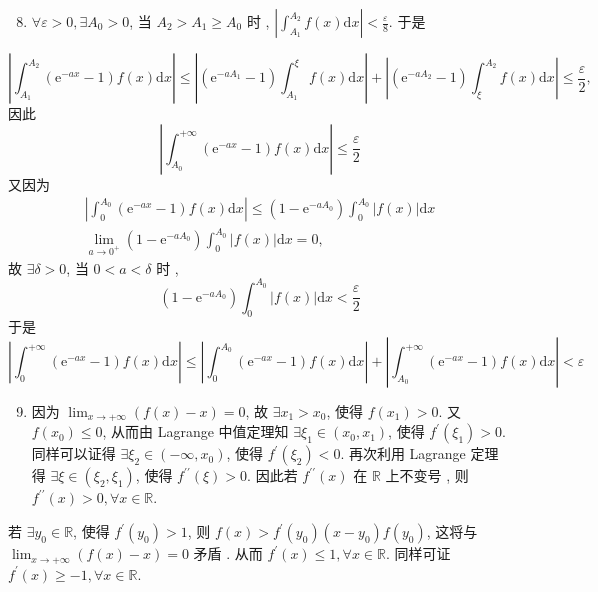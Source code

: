 \documentclass[10pt]{article}
\begin{document}
\begin{enumerate}
  \setcounter{enumi}{7}
  \item $\forall \varepsilon>0, \exists A_{0}>0$,  当  $A_{2}>A_{1} \geqslant A_{0}$  时 , $\left|\int_{A_{1}}^{A_{2}} f(x) \mathrm{d} x\right|<\frac{\varepsilon}{8}$.  于是 
\end{enumerate}
$$
\left|\int_{A_{1}}^{A_{2}}\left(\mathrm{e}^{-a x}-1\right) f(x) \mathrm{d} x\right| \leqslant\left|\left(\mathrm{e}^{-a A_{1}}-1\right) \int_{A_{1}}^{\xi} f(x) \mathrm{d} x\right|+\left|\left(\mathrm{e}^{-a A_{2}}-1\right) \int_{\xi}^{A_{2}} f(x) \mathrm{d} x\right| \leqslant \frac{\varepsilon}{2},
$$
 因此 
$$
\left|\int_{A_{0}}^{+\infty}\left(\mathrm{e}^{-a x}-1\right) f(x) \mathrm{d} x\right| \leqslant \frac{\varepsilon}{2}
$$
 又因为 
$$
\begin{gathered}
\left|\int_{0}^{A_{0}}\left(\mathrm{e}^{-a x}-1\right) f(x) \mathrm{d} x\right| \leqslant\left(1-\mathrm{e}^{-a A_{0}}\right) \int_{0}^{A_{0}}|f(x)| \mathrm{d} x \\
\lim _{a \rightarrow 0^{+}}\left(1-\mathrm{e}^{-a A_{0}}\right) \int_{0}^{A_{0}}|f(x)| \mathrm{d} x=0,
\end{gathered}
$$
 故  $\exists \delta>0$,  当  $0<a<\delta$  时 ,
$$
\left(1-\mathrm{e}^{-a A_{0}}\right) \int_{0}^{A_{0}}|f(x)| \mathrm{d} x<\frac{\varepsilon}{2}
$$
 于是 
$$
\left|\int_{0}^{+\infty}\left(\mathrm{e}^{-a x}-1\right) f(x) \mathrm{d} x\right| \leqslant\left|\int_{0}^{A_{0}}\left(\mathrm{e}^{-a x}-1\right) f(x) \mathrm{d} x\right|+\left|\int_{A_{0}}^{+\infty}\left(\mathrm{e}^{-a x}-1\right) f(x) \mathrm{d} x\right|<\varepsilon
$$

\begin{enumerate}
  \setcounter{enumi}{8}
  \item  因为  $\lim _{x \rightarrow+\infty}(f(x)-x)=0$,  故  $\exists x_{1}>x_{0}$,  使得  $f\left(x_{1}\right)>0$.  又  $f\left(x_{0}\right) \leqslant 0$,  从而由  Lagrange  中值定理知  $\exists \xi_{1} \in\left(x_{0}, x_{1}\right)$,  使得  $f^{\prime}\left(\xi_{1}\right)>0$.  同样可以证得  $\exists \xi_{2} \in\left(-\infty, x_{0}\right)$,  使得  $f^{\prime}\left(\xi_{2}\right)<0$.  再次利用  Lagrange  定理得  $\exists \xi \in\left(\xi_{2}, \xi_{1}\right)$,  使得  $f^{\prime \prime}(\xi)>0$.  因此若  $f^{\prime \prime}(x)$  在  $\mathbb{R}$  上不变号 ,  则  $f^{\prime \prime}(x)>0, \forall x \in \mathbb{R}$.
\end{enumerate}
 若  $\exists y_{0} \in \mathbb{R}$,  使得  $f^{\prime}\left(y_{0}\right)>1$,  则  $f(x)>f^{\prime}\left(y_{0}\right)\left(x-y_{0}\right) f\left(y_{0}\right)$,  这将与  $\lim _{x \rightarrow+\infty}(f(x)-x)=0$  矛盾 .  从而  $f^{\prime}(x) \leqslant 1, \forall x \in \mathbb{R}$.  同样可证  $f^{\prime}(x) \geqslant-1, \forall x \in \mathbb{R}$.
\end{document}
